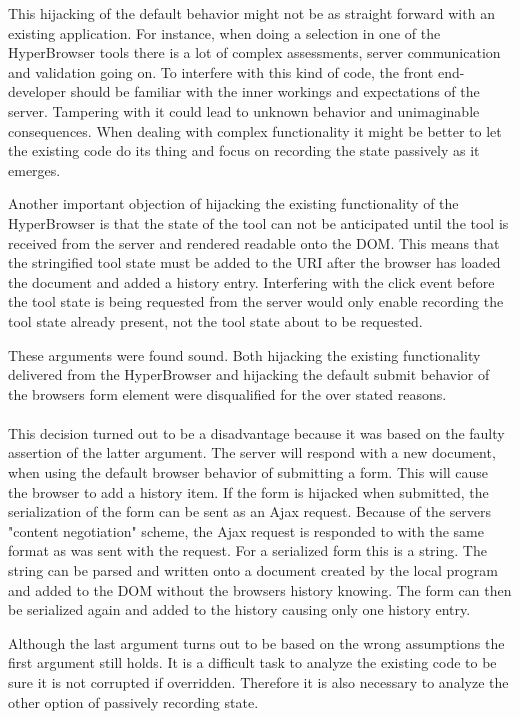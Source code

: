 \documentclass[english]{ifimaster}
\begin{document}
This hijacking of the default behavior might not be as straight forward with an existing application. For instance, when doing a selection in one of the HyperBrowser tools there is a lot of complex assessments, server communication and validation going on. To interfere with this kind of code, the front end-developer should be familiar with the inner workings and expectations of the server. Tampering with it could lead to unknown behavior and unimaginable consequences. When dealing with complex functionality it might be better to let the existing code do its thing and focus on recording the state passively as it emerges.

Another important objection of hijacking the existing functionality of the HyperBrowser is that the state of the tool can not be anticipated until the tool is received from the server and rendered readable onto the DOM. This means that the stringified tool state must be added to the URI after the browser has loaded the document and added a history entry. Interfering with the click event before the tool state is being requested from the server would only enable recording the tool state already present, not the tool state about to be requested. 

These arguments were found sound. Both hijacking the existing functionality delivered from the HyperBrowser and hijacking the default submit behavior of the browsers form element were disqualified for the over stated reasons.

\paragraph{}This decision turned out to be a disadvantage because it was based on the faulty assertion of the latter argument. The server will respond with a new document, when using the default browser behavior of submitting a form. This will cause the browser to add a history item. If the form is hijacked when submitted, the serialization of the form can be sent as an Ajax request. Because of the servers "content negotiation" scheme, the Ajax request is responded to with the same format as was sent with the request. For a serialized form this is a string. The string can be parsed and written onto a document created by the local program and added to the DOM without the browsers history knowing. The form can then be serialized again and added to the history causing only one history entry.

Although the last argument turns out to be based on the wrong assumptions the first argument still holds. It is a difficult task to analyze the existing code to be sure it is not corrupted if overridden. Therefore it is also necessary to analyze the other option of passively recording state.
\end{document}
